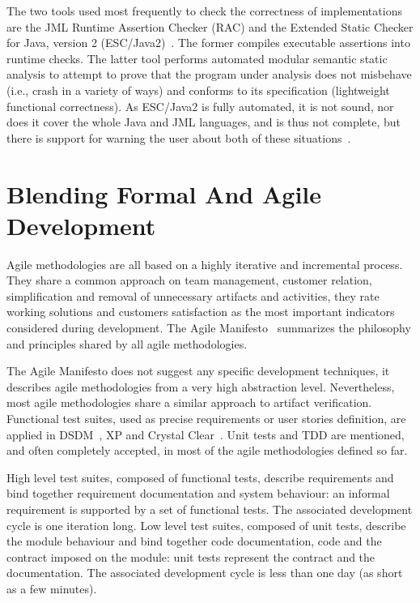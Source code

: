 \documentclass{article}
\begin{document}
The two tools used most frequently to check the correctness of implementations are the JML Runtime Assertion Checker (RAC) and the
Extended Static Checker for Java, version 2 (ESC/Java2)~\cite{Cheon-Leavens02b,BurdyEtal05-STTT,KiniryCok04}.  
The former compiles executable assertions into runtime checks.  
The latter tool performs automated modular semantic static analysis to attempt to prove that the program under analysis does not misbehave (i.e., crash in a variety of ways) and conforms to its specification (lightweight functional correctness).  
As ESC/Java2 is fully automated, it is not sound, nor does it cover the whole Java and JML languages, and is thus not complete, but there is support for warning the user about both of these situations~\cite{KiniryEtal06}.



\section{Blending Formal And Agile Development}
\label{sec:blending_formal_and_agile_development}

Agile methodologies are all based on a highly iterative and incremental process.
They share a common approach on team management, customer relation, simplification and removal of unnecessary artifacts and activities, they rate working solutions and customers satisfaction as the most important indicators considered during development.
The Agile Manifesto~\cite{Beck2001} summarizes the philosophy and principles shared by all agile methodologies.

The Agile Manifesto does not suggest any specific development techniques, it describes agile methodologies from a very high abstraction level.
Nevertheless, most agile methodologies share a similar approach to artifact verification.
Functional test suites, used as precise requirements or user stories definition, are applied in DSDM~\cite{Stapleton1997}, XP and Crystal Clear~\cite{Cockburn2004}. 
Unit tests and TDD are mentioned, and often completely accepted, in most of the agile methodologies defined so far.

High level test suites, composed of functional tests, describe requirements and bind together requirement documentation and system behaviour: an informal requirement is supported by a set of functional tests. 
The associated development cycle is one iteration long. 
Low level test suites, composed of unit tests, describe the module behaviour and bind together code documentation, code and the contract imposed on the module: unit tests represent the contract and the documentation. 
The associated development cycle is less than one day (as short as a few minutes).
\end{document}
